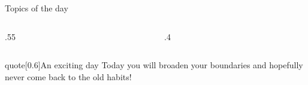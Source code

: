 
\PrepareURLsymbol[PB]
\begin{frame}
    \titlepage
\end{frame}
\begin{frame}[label=toc,plain,noframenumbering]{Topics of the day}
    \begin{columns}
        \hfill
        \begin{column}{.55\textwidth}
            \hspace*{4mm}
            \begin{minipage}[0.5\textheight]{\textwidth}
                \tableofcontents[sections={1}, subsubsectionstyle=hide]
                \vspace{3mm}
                \tableofcontents[sections={2}, hideallsubsections]
            \end{minipage}
        \end{column}
        \hfill
        \begin{column}{.4\textwidth}
            \begin{minipage}[0.5\textheight]{\textwidth}
                \tableofcontents[sections={3-}, hideallsubsections]
            \end{minipage}
        \end{column}
        \hfill
    \end{columns}
    \vspace{2mm}
    \begin{varblock}{quote}[0.6\textwidth]{An exciting day}
        \normalfont\small
        Today you will broaden your boundaries and hopefully never come back to the old habits!
    \end{varblock}
\end{frame}
